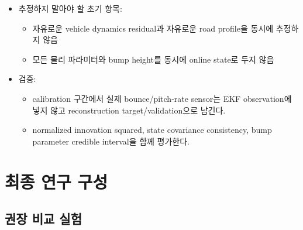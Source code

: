 \documentclass[letterpaper,10pt,journal,twocolumn]{ieeeconf}
\begin{document}
\begin{itemize}
  \begin{itemize}
  
  \item
    질량, 관성, wheelbase, CG height
  \item
    suspension/tire stiffness and damping
  \item
    rolling/aero resistance coefficient
  \item
    \(Q,R\)와 초기 covariance
  \end{itemize}
\item
  추정하지 말아야 할 초기 항목:

  \begin{itemize}
  
  \item
    자유로운 vehicle dynamics residual과 자유로운 road profile을 동시에 추정하지 않음
  \item
    모든 물리 파라미터와 bump height를 동시에 online state로 두지 않음
  \end{itemize}
\item
  검증:

  \begin{itemize}
  
  \item
    calibration 구간에서 실제 bounce/pitch-rate sensor는 EKF observation에 넣지 않고 reconstruction target/validation으로 남긴다.
  \item
    normalized innovation squared, state covariance consistency, bump parameter credible interval을 함께 평가한다.
  \end{itemize}
\end{itemize}

\section{최종 연구 구성}

\subsection{권장 비교 실험}
\end{document}

